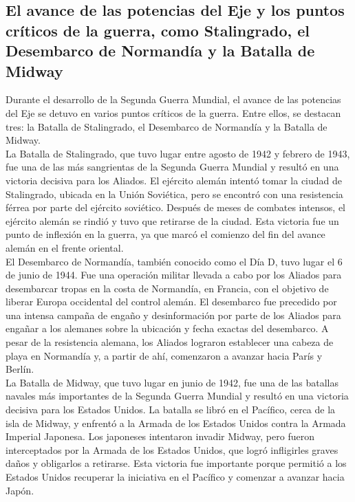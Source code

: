 \documentclass{article}
\theoremstyle{mytheoremstyle}
\theoremstyle{mytheoremstyle}
\theoremstyle{myproblemstyle}
\begin{document}
\subsection{El avance de las potencias del Eje y los puntos críticos de la guerra, como Stalingrado, el Desembarco de Normandía y la Batalla de Midway}


Durante el desarrollo de la Segunda Guerra Mundial, el avance de las potencias del Eje se detuvo en varios puntos críticos de la guerra. Entre ellos, se destacan tres: la Batalla de Stalingrado, el Desembarco de Normandía y la Batalla de Midway.\\

La Batalla de Stalingrado, que tuvo lugar entre agosto de 1942 y febrero de 1943, fue una de las más sangrientas de la Segunda Guerra Mundial y resultó en una victoria decisiva para los Aliados. El ejército alemán intentó tomar la ciudad de Stalingrado, ubicada en la Unión Soviética, pero se encontró con una resistencia férrea por parte del ejército soviético. Después de meses de combates intensos, el ejército alemán se rindió y tuvo que retirarse de la ciudad. Esta victoria fue un punto de inflexión en la guerra, ya que marcó el comienzo del fin del avance alemán en el frente oriental.\\

El Desembarco de Normandía, también conocido como el Día D, tuvo lugar el 6 de junio de 1944. Fue una operación militar llevada a cabo por los Aliados para desembarcar tropas en la costa de Normandía, en Francia, con el objetivo de liberar Europa occidental del control alemán. El desembarco fue precedido por una intensa campaña de engaño y desinformación por parte de los Aliados para engañar a los alemanes sobre la ubicación y fecha exactas del desembarco. A pesar de la resistencia alemana, los Aliados lograron establecer una cabeza de playa en Normandía y, a partir de ahí, comenzaron a avanzar hacia París y Berlín.\\

La Batalla de Midway, que tuvo lugar en junio de 1942, fue una de las batallas navales más importantes de la Segunda Guerra Mundial y resultó en una victoria decisiva para los Estados Unidos. La batalla se libró en el Pacífico, cerca de la isla de Midway, y enfrentó a la Armada de los Estados Unidos contra la Armada Imperial Japonesa. Los japoneses intentaron invadir Midway, pero fueron interceptados por la Armada de los Estados Unidos, que logró infligirles graves daños y obligarlos a retirarse. Esta victoria fue importante porque permitió a los Estados Unidos recuperar la iniciativa en el Pacífico y comenzar a avanzar hacia Japón.\\
\end{document}
